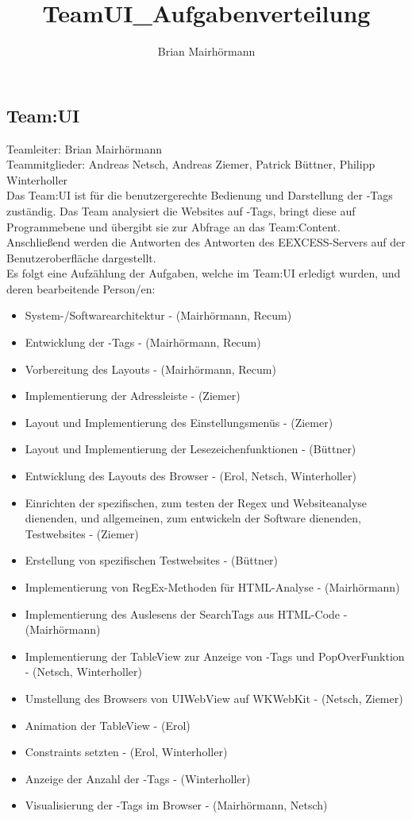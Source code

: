 \title{TeamUI_Aufgabenverteilung}
\author{Brian Mairhörmann}

\subsection{Team:UI}

Teamleiter: Brian Mairhörmann\\
Teammitglieder: Andreas Netsch, Andreas Ziemer, Patrick Büttner, Philipp Winterholler\\
Das Team:UI ist für die benutzergerechte Bedienung und Darstellung der \SEARCH-Tags zuständig.
Das Team analysiert die Websites auf \SEARCH-Tags, bringt diese auf Programmebene und übergibt sie
zur Abfrage an das Team:Content. Anschließend werden die Antworten des Antworten des EEXCESS-Servers
auf der Benutzeroberfläche dargestellt.\\
Es folgt eine Aufzählung der Aufgaben, welche im Team:UI erledigt wurden, und deren bearbeitende Person/en:\\
\begin{itemize}
	\item System-/Softwarearchitektur - (Mairhörmann, Recum)
	\item Entwicklung der \SEARCH-Tags - (Mairhörmann, Recum)
	\item Vorbereitung des Layouts - (Mairhörmann, Recum)
	\item Implementierung der Adressleiste - (Ziemer)
	\item Layout und Implementierung des Einstellungsmenüs - (Ziemer)
	\item Layout und Implementierung der Lesezeichenfunktionen - (Büttner)
	\item Entwicklung des Layouts des Browser - (Erol, Netsch, Winterholler)
	\item Einrichten der spezifischen, zum testen der Regex und Websiteanalyse dienenden, und allgemeinen, zum entwickeln der Software dienenden, Testwebsites - (Ziemer)
	\item Erstellung von spezifischen Testwebsites - (Büttner)
	\item Implementierung von RegEx-Methoden für HTML-Analyse - (Mairhörmann)
	\item Implementierung des Auslesens der SearchTags aus HTML-Code - (Mairhörmann)
	\item Implementierung der TableView zur Anzeige von \SEARCH-Tags und PopOverFunktion - (Netsch, Winterholler)
	\item Umstellung des Browsers von UIWebView auf WKWebKit - (Netsch, Ziemer)
	\item Animation der TableView - (Erol)
	\item Constraints setzten - (Erol, Winterholler)
	\item Anzeige der Anzahl der \SEARCH-Tags - (Winterholler)
	\item Visualisierung der \SEARCH-Tags im Browser - (Mairhörmann, Netsch)\\
\end{itemize}

